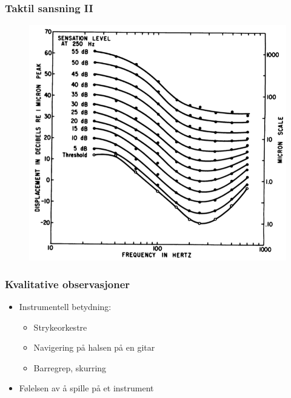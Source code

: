 \documentclass{beamer}
\begin{document}
\begin{frame}
	\frametitle{Taktil sansning II}
	\begin{figure}
		\includegraphics[scale=.3]{figs/verrillo.png}
		\caption{\citep[p.\ 287]{verrillo_vibration_1992}}
	\end{figure}		
\end{frame}



\begin{frame}
	\frametitle{Kvalitative observasjoner}
	\begin{itemize}[<+->]
		\item Instrumentell betydning:
		\begin{itemize}
			\item Strykeorkestre \citep{askenfelt_vibration_1992}
			\item Navigering på halsen på en gitar \citep{kvifte_instruments_2007}
			\item Barregrep, skurring
		\end{itemize}
		\item Følelsen av å spille på et instrument \citep{chafe_musical_1996}
	\end{itemize}
\end{frame}
\end{document}
